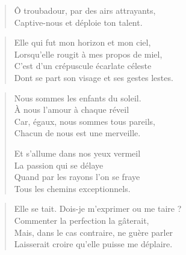 \begin{verse}%
  \distique%
  Ô troubadour, par des airs attrayants,\\  %
  Captive-nous et déploie ton talent.
\end{verse}

\begin{verse}%
  \quatrain%
  Elle qui fut mon horizon et mon ciel,\\  %
  Lorsqu’elle rougit à mes propos de miel,\\  %
  C’est d’un crépuscule écarlate céleste\\  %
  Dont se part son visage et ses gestes lestes.
\end{verse}

\begin{verse}%
  \quatrain%
  Nous sommes les enfants du soleil.\\  %
  À nous l’amour à chaque réveil\\  %
  Car, égaux, nous sommes tous pareils,\\  %
  Chacun de nous est une merveille.

  Et s’allume dans nos yeux vermeil\\  %
  La passion qui se délaye\\  %
  Quand par les rayons l’on se fraye\\  %
  Tous les chemins exceptionnels.
\end{verse}

\begin{verse}%
  \quatrain%
  Elle se tait. Dois-je m’exprimer ou me taire ?\\  %
  Commenter la perfection la gâterait,\\  %
  Mais, dans le cas contraire, ne guère parler\\  %
  Laisserait croire qu’elle puisse me déplaire.
\end{verse}


